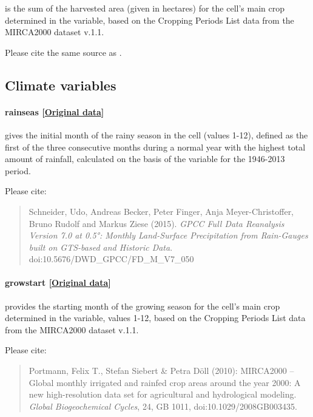 \documentclass[]{book}
\begin{document}
is the sum of the harvested area (given in hectares) for the cell's main
crop determined in the  variable, based on the Cropping
Periods List data from the MIRCA2000 dataset v.1.1.

Please cite the same source as .

\subsection{Climate variables}\label{climate-variables}

\paragraph{rainseas
{[}\href{ftp://ftp.dwd.de/pub/data/gpcc/html/fulldata_v7_doi_download.html}{Original
data}{]}}\label{rainseas}

gives the initial month of the rainy season in the cell (values 1-12),
defined as the first of the three consecutive months during a normal
year with the highest total amount of rainfall, calculated on the basis
of the  variable for the 1946-2013 period.

Please cite:

\begin{quote}
Schneider, Udo, Andreas Becker, Peter Finger, Anja Meyer-Christoffer,
Bruno Rudolf and Markus Ziese (2015). \emph{GPCC Full Data Reanalysis
Version 7.0 at 0.5°: Monthly Land-Surface Precipitation from Rain-Gauges
built on GTS-based and Historic Data}.
doi:10.5676/DWD\_GPCC/FD\_M\_V7\_050
\end{quote}

\paragraph{growstart
{[}\href{http://www.uni-frankfurt.de/45218031}{Original
data}{]}}\label{growstart}

provides the starting month of the growing season for the cell's main
crop determined in the  variable, values 1-12, based on
the Cropping Periods List data from the MIRCA2000 dataset v.1.1.

Please cite:

\begin{quote}
Portmann, Felix T., Stefan Siebert \& Petra Döll (2010): MIRCA2000 --
Global monthly irrigated and rainfed crop areas around the year 2000: A
new high-resolution data set for agricultural and hydrological modeling.
\emph{Global Biogeochemical Cycles}, 24, GB 1011,
doi:10.1029/2008GB003435.
\end{quote}
\end{document}
